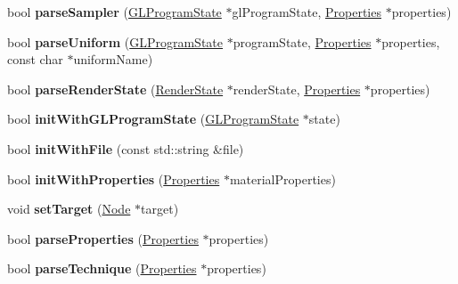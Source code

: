 \begin{DoxyCompactItemize}
bool {\bfseries parse\+Sampler} (\hyperlink{classGLProgramState}{G\+L\+Program\+State} $\ast$gl\+Program\+State, \hyperlink{classProperties}{Properties} $\ast$properties)
\item 
\mbox{\label{classMaterial_a247f9daeec0f17debad6b1f3038e9968}} 
bool {\bfseries parse\+Uniform} (\hyperlink{classGLProgramState}{G\+L\+Program\+State} $\ast$program\+State, \hyperlink{classProperties}{Properties} $\ast$properties, const char $\ast$uniform\+Name)
\item 
\mbox{\label{classMaterial_a47b833e30a164c440f1b9f9e85487f52}} 
bool {\bfseries parse\+Render\+State} (\hyperlink{classRenderState}{Render\+State} $\ast$render\+State, \hyperlink{classProperties}{Properties} $\ast$properties)
\item 
\mbox{\label{classMaterial_a2cdb607bb32f8a27d55d88c067e8f2a8}} 
bool {\bfseries init\+With\+G\+L\+Program\+State} (\hyperlink{classGLProgramState}{G\+L\+Program\+State} $\ast$state)
\item 
\mbox{\label{classMaterial_ac800c5d49cbb8ebc101b690a65cfc1b7}} 
bool {\bfseries init\+With\+File} (const std\+::string \&file)
\item 
\mbox{\label{classMaterial_a34e5a31eb938ea98e542aad8bbd4e891}} 
bool {\bfseries init\+With\+Properties} (\hyperlink{classProperties}{Properties} $\ast$material\+Properties)
\item 
\mbox{\label{classMaterial_ac95e0062cfe6878550338818e96e1a8c}} 
void {\bfseries set\+Target} (\hyperlink{classNode}{Node} $\ast$target)
\item 
\mbox{\label{classMaterial_a4e6aa8011cfd995e0601b4ec6a059d8f}} 
bool {\bfseries parse\+Properties} (\hyperlink{classProperties}{Properties} $\ast$properties)
\item 
\mbox{\label{classMaterial_a89d534b505198eeedf69511d134a0dec}} 
bool {\bfseries parse\+Technique} (\hyperlink{classProperties}{Properties} $\ast$properties)
\item 
\mbox{\label{classMaterial_aaf062af5584ee89e97aa2ef590650eaa}} 

\end{DoxyCompactItemize}
